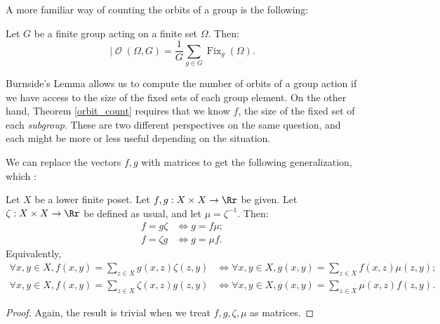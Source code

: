 \documentclass[12pt]{pom_thesis}
\DeclareMathOperator{\fix}{Fix}
\DeclareMathOperator{\orb}{\mathcal{O}}
\begin{document}
\iffalse


A more familiar way of counting the orbits of a group is the following:
\begin{thm}\label{burnside}
Let $G$ be a finite group acting on a finite set $\Omega$. Then:
\[
|\orb(\Omega, G) = \frac{1}{G}\sum_{g \in G}\fix_g(\Omega).
\]
\end{thm}
Burnside's Lemma allows us to compute the number of orbits of a group action if we have access to the size of the fixed sets of each group element. On the other hand, Theorem \ref{orbit_count} requires that we know $f$, the size of the fixed set of each \emph{subgroup}. These are two different perspectives on the same question, and each might be more or less useful depending on the situation. 

We can replace the vectors $f,g$ with matrices to get the following generalization, which :
\begin{thm}\label{mob_inv_old}
Let $X$ be a lower finite poset.  Let $f,g:X \times X \rightarrow \Rr$ be given. Let $\zeta:X \times X \rightarrow \Rr$ be defined as usual, and let $\mu = \zeta^{-1}$. Then:
\begin{align*}
f = g \zeta &\iff g = f \mu;\\
f = \zeta g &\iff g = \mu f.
\end{align*}
Equivalently,
\begin{align*}
\forall x,y \in X, f(x,y) = \sum_{z \in X}g(x,z)\zeta(z,y) &\iff \forall x,y \in X, g(x,y) = \sum_{z \in X}f(x,z)\mu(z,y);\\
\forall x,y \in X, f(x,y) = \sum_{z \in X}\zeta(x,z)g(z,y) &\iff \forall x,y \in X, g(x,y) = \sum_{z \in X}\mu(x,z)f(z,y).
\end{align*}
\begin{proof}
Again, the result is trivial when we treat $f,g,\zeta,\mu$ as matrices.
\end{proof}
\end{thm}
\end{document}
